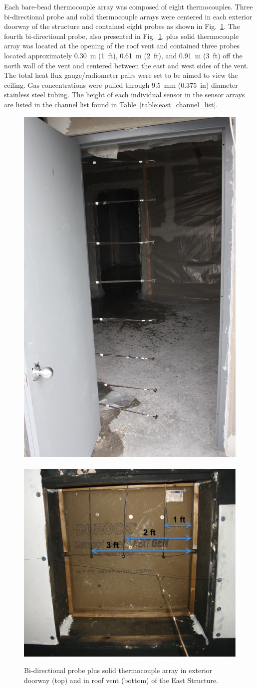 \documentclass[12pt,oneside]{book}
\begin{document}
Each bare-bead thermocouple array was composed of eight thermocouples. Three bi-directional probe and solid thermocouple arrays were centered in each exterior doorway of the structure and contained eight probes as shown in Fig.~\ref{fig:BDP_arrays}. The fourth bi-directional probe, also presented in Fig.~\ref{fig:BDP_arrays}, plus solid thermocouple array was located at the opening of the roof vent and contained three probes located approximately 0.30~m (1~ft), 0.61~m (2~ft), and 0.91~m (3~ft) off the north wall of the vent and centered between the east and west sides of the vent. The total heat flux gauge/radiometer pairs were set to be aimed to view the ceiling. Gas concentrations were pulled through 9.5~mm (0.375~in) diameter stainless steel tubing. The height of each individual sensor in the sensor arrays are listed in the channel list found in Table~\ref{table:east_channel_list}.   

\begin{figure}[!ht]
	\includegraphics[width=0.45\columnwidth]{../Figures/Pictures/doorway_BDPs}
	\\~\\
	\includegraphics[width=0.65\columnwidth]{../Figures/Pictures/roof_vent_BDPs.png}
	\caption[Bi-directional probe plus solid thermocouple arrays in East Structure.]{Bi-directional probe plus solid thermocouple array in exterior doorway (top) and in roof vent (bottom) of the East Structure.}
	\label{fig:BDP_arrays}
\end{figure}
\end{document}
